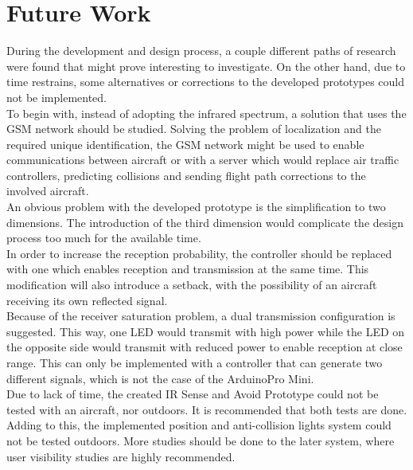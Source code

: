 \section{Future Work}
\label{section:future}

During the development and design process, a couple different paths of research were found that might prove interesting to investigate. On the other hand, due to time restrains, some alternatives or corrections to the developed prototypes could not be implemented.\\
To begin with, instead of adopting the infrared spectrum, a solution that uses the GSM network should be studied. Solving the problem of localization and the required unique identification, the GSM network might be used to enable communications between aircraft or with a server which would replace air traffic controllers, predicting collisions and sending flight path corrections to the involved aircraft.\\
An obvious problem with the developed prototype is the simplification to two dimensions. The introduction of the third dimension would complicate the design process too much for the available time.\\
In order to increase the reception probability, the controller should be replaced with one which enables reception and transmission at the same time. This modification will also introduce a setback, with the possibility of an aircraft receiving its own reflected signal.\\
Because of the receiver saturation problem, a dual transmission configuration is suggested. This way, one LED would transmit with high power while the LED on the opposite side would transmit with reduced power to enable reception at close range. This can only be implemented with a controller that can generate two different signals, which is not the case of the Arduino\texttrademark Pro Mini.\\
Due to lack of time, the created IR Sense and Avoid Prototype could not be tested with an aircraft, nor outdoors. It is recommended that both tests are done. Adding to this, the implemented position and anti-collision lights system could not be tested outdoors. More studies should be done to the later system, where user visibility studies are highly recommended.\\

\cleardoublepage

